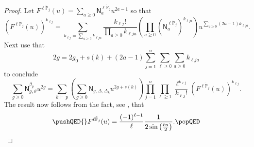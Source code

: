 \documentclass[11pt]{amsart}
\numberwithin{equation}{section}
\theoremstyle{plain}
\theoremstyle{remark}
\theoremstyle{definition}
\newcommand{\PP}{\mathbb{P}}
\begin{document}
\begin{proof}
  Let $F^{\ell\tilde{\PP}_j}(u) = \sum_{a \geq 0} \mathsf{N}^{\ell \tilde{\PP}_j}_a u^{2a - 1}$ so that
  $$\left(F^{\ell\tilde{\PP}_j}(u)\right)^{k_{\ell j }} = \sum_{k_{\ell j} = \sum_{a \geq 0} k_{\ell j a}} \frac{k_{\ell j}!}{\prod_{a \geq 0} k_{\ell j a}} \left(\prod_{a \geq 0} \left(\mathsf{N}_{a}^{\ell \tilde{\PP}_j}\right)^{k_{\ell j a}}\right)u^{\sum_{a \geq 0}(2a -1)k_{\ell j a}}.$$
Next use that $$2g = 2g_0 + s(k) + (2a - 1) \sum_{j=1}^n \sum_{\ell \geq 0} \sum_{a \geq 0} k_{\ell j a}$$ to conclude 
\begin{equation*}
    \sum_{g \geq 0 } \mathsf{N}_{g,\vartheta}^{\beta_p} u^{2g} =  \sum_{k \, \vdash \, p} \left(\sum_{g \geq 0} \mathsf{N}_{g,\Delta, \Delta_k}u^{2g + s(k)} \right)\prod_{j=1}^n \prod_{\ell \geq 1} \frac{\ell^{k_{\ell j}}}{k_{\ell j}!} \left(F^{\ell \tilde{\PP}_j}(u)\right)^{k_{\ell j}}. 
\end{equation*}
The result now follows from the fact, see \cite[Lemma 2.20]{bousseau2018thesis}, that
\begin{equation*}\pushQED{\qed}
F^{\ell \tilde{\PP}_j}(u) = \frac{(-1)^{\ell - 1}}{\ell} \frac{1}{2 \sin\left(\frac{\ell u}{2}\right)}.\qedhere \popQED
\end{equation*}
\renewcommand{\qed}{}     
\end{proof}
\end{document}
